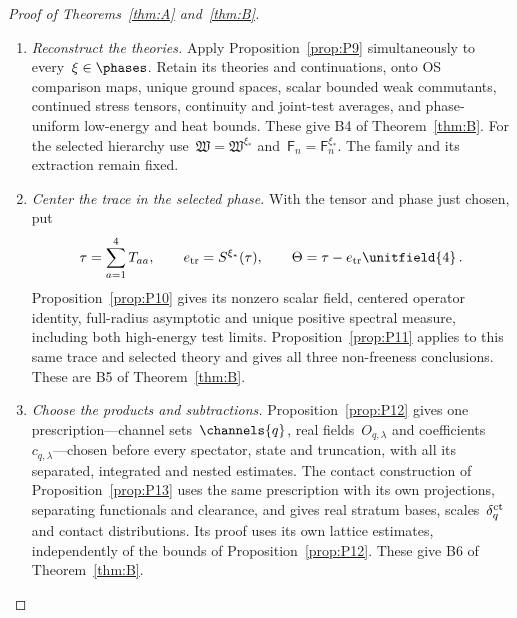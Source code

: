 \begin{proof}[Proof of Theorems~\ref{thm:A} and~\ref{thm:B}]
\begin{enumerate}[label=\emph{Step \arabic*:},ref=\arabic*,leftmargin=4.5em,itemsep=0.4em,beginpenalty=10000]
\item\label{step:deduction-reconstruction} \emph{Reconstruct the theories.} Apply Proposition~\ref{prop:P9} simultaneously to every~$\xi\in\phases$. Retain its theories and continuations, onto OS comparison maps, unique ground spaces, scalar bounded weak commutants, continued stress tensors, continuity and joint-test averages, and phase-uniform low-energy and heat bounds. These give B4 of Theorem~\ref{thm:B}. For the selected hierarchy use~$\mathfrak W=\mathfrak W^{\xi_*}$ and~$\mathsf F_n=\mathsf F_n^{\xi_*}$. The family and its extraction remain fixed.

\item\label{step:deduction-trace} \emph{Center the trace in the selected phase.} With the tensor and phase just chosen, put
\begin{equation}\label{eq:deduction-trace}
\tau=\sum_{a=1}^4T_{aa},\qquad e_{\rm tr}=S^{\xi_*}(\tau),\qquad \Theta=\tau-e_{\rm tr}\unitfield{4}\,.
\end{equation}
Proposition~\ref{prop:P10} gives its nonzero scalar field, centered operator identity, full-radius asymptotic and unique positive spectral measure, including both high-energy test limits. Proposition~\ref{prop:P11} applies to this same trace and selected theory and gives all three non-freeness conclusions. These are B5 of Theorem~\ref{thm:B}.

\item\label{step:deduction-products} \emph{Choose the products and subtractions.} Proposition~\ref{prop:P12} gives one prescription---channel sets~$\channels{q}$, real fields~$O_{q,\lambda}$ and coefficients~$c_{q,\lambda}$---chosen before every spectator, state and truncation, with all its separated, integrated and nested estimates. The contact construction of Proposition~\ref{prop:P13} uses the same prescription with its own projections, separating functionals and clearance, and gives real stratum bases, scales~$\delta_q^{\rm ct}$ and contact distributions. Its proof uses its own lattice estimates, independently of the bounds of Proposition~\ref{prop:P12}. These give B6 of Theorem~\ref{thm:B}.


\end{enumerate}
\end{proof}
